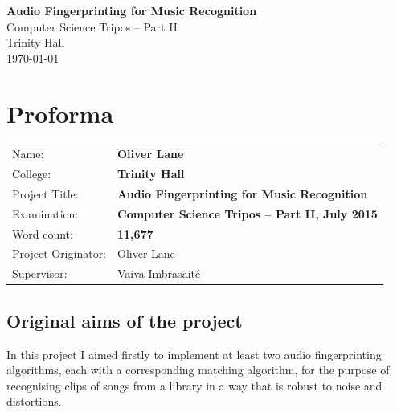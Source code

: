 \documentclass[12pt,a4paper,twoside,openright]{report}
\begin{document}





\pagestyle{empty}


\vspace*{60mm}
\begin{center}
\Huge
\textbf{Audio Fingerprinting for Music Recognition} \\[5mm]
Computer Science Tripos -- Part II \\[5mm]
Trinity Hall \\[5mm]
\today  %
\end{center}


\pagestyle{plain}

\chapter*{Proforma}

{\large
\begin{tabular}{ll}
Name:               & \bf Oliver Lane                       \\
College:            & \bf Trinity Hall                     \\
Project Title:      & \bf Audio Fingerprinting for Music Recognition \\
Examination:        & \bf Computer Science Tripos -- Part II, July 2015  \\
Word count:         & \bf 11,677  \\
Project Originator: & Oliver Lane                    \\
Supervisor:         & Vaiva Imbrasait\'{e}                    \\ 
\end{tabular}
}

\section*{Original aims of the project}

In this project I aimed firstly to implement at least two audio fingerprinting algorithms, each with a corresponding matching algorithm, for the purpose of recognising clips of songs from a library in a way that is robust to noise and distortions.
\end{document}
